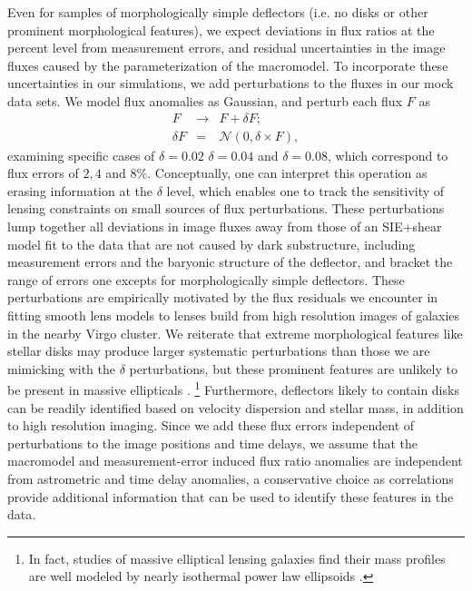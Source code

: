 Even for samples of morphologically simple deflectors (i.e. no disks or other prominent morphological features), we expect deviations in flux ratios at the percent level from measurement errors, and residual uncertainties in the image fluxes caused by the parameterization of the macromodel. To incorporate these uncertainties in our simulations, we add perturbations to the fluxes in our mock data sets. We model flux anomalies as Gaussian, and perturb each flux $F$ as
\begin{eqnarray}
\label{eqn:newfr}
F & \rightarrow & F + \delta F; \\ \delta F & = & \nonumber \mathcal{N} \left(0,\delta \times F\right),
\end{eqnarray}
examining specific cases of $\delta = 0.02$ $\delta = 0.04$ and $\delta = 0.08$, which correspond to flux errors of $2,4$ and $8\%$. Conceptually, one can interpret this operation as erasing information at the $\delta$ level, which enables one to track the sensitivity of lensing constraints on small sources of flux perturbations. These perturbations lump together all deviations in image fluxes away from those of an SIE+shear model fit to the data that are not caused by dark substructure, including measurement errors and the baryonic structure of the deflector, and bracket the range of errors one excepts for morphologically simple deflectors. These perturbations are empirically motivated by the flux residuals we encounter in \citep{Gilman++17} fitting smooth lens models to lenses build from high resolution images of galaxies in the nearby Virgo cluster. We reiterate that extreme morphological features like stellar disks may produce larger systematic perturbations than those we are mimicking with the $\delta$ perturbations, but these prominent features are unlikely to be present in massive ellipticals \citep{Auger++10,Son++13a}. \footnote{In fact, studies of massive elliptical lensing galaxies find their mass profiles are well modeled by nearly isothermal power law ellipsoids \citep{Shankar++17,Gilman++17}.} Furthermore, deflectors likely to contain disks can be readily identified based on velocity dispersion and stellar mass, in addition to high resolution imaging. Since we add these flux errors independent of perturbations to the image positions and time delays, we assume that the macromodel and measurement-error induced flux ratio anomalies are independent from astrometric and time delay anomalies, a conservative choice as correlations provide additional information that can be used to identify these features in the data.

